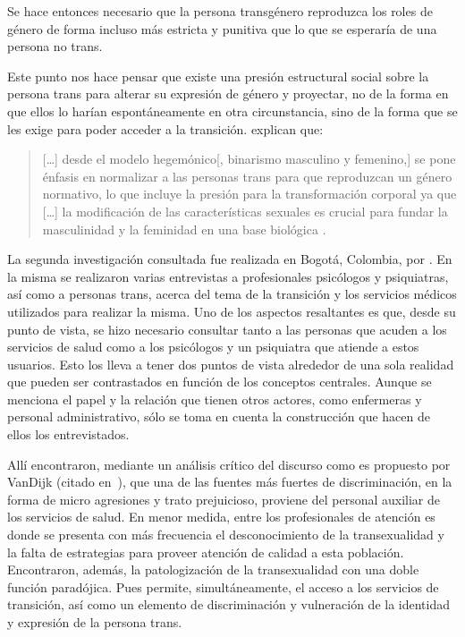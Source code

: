 Se hace entonces necesario que la persona transgénero reproduzca los roles de
género de forma incluso más estricta y punitiva que lo que se esperaría de una
persona no trans.

Este punto nos hace pensar que existe una presión estructural social sobre la
persona trans para alterar su expresión de género y proyectar, no de la forma en
que ellos lo harían espontáneamente en otra circunstancia, sino de la forma que
se les exige para poder acceder a la transición. \textcite{Coll-Planas2015}
explican que:

\begin{quote}
[…] desde el modelo hegemónico[, binarismo masculino y femenino,] se pone
énfasis en normalizar a las personas trans para que reproduzcan un género
normativo, lo que incluye la presión para la transformación corporal ya que […]
la modificación de las características sexuales es crucial para fundar la
masculinidad y la feminidad en una base biológica \parencite[][p.
427]{Coll-Planas2015}.
\end{quote}

La segunda investigación consultada fue realizada en Bogotá,
Colombia, por \textcite{LassoBaez2014}. En la misma se realizaron varias
entrevistas a profesionales psicólogos y psiquiatras, así como a personas trans,
acerca del tema de la transición y los servicios médicos utilizados para
realizar la misma. Uno de los aspectos resaltantes es que, desde su punto de
vista, se hizo necesario consultar tanto a las personas que acuden a los
servicios de salud como a los psicólogos y un psiquiatra que atiende a estos
usuarios. Esto los lleva a tener dos puntos de vista alrededor de una sola
realidad que pueden ser contrastados en función de los conceptos centrales.
Aunque se menciona el papel y la relación que tienen otros actores, como
enfermeras y personal administrativo, sólo se toma en cuenta la construcción que
hacen de ellos los entrevistados.

Allí encontraron, mediante un análisis crítico del discurso como es propuesto
por VanDijk (citado en~\cite[][p. 111]{LassoBaez2014}), que una de las fuentes
más fuertes de discriminación, en la forma de micro agresiones y trato
prejuicioso, proviene del personal auxiliar de los servicios de salud. En menor
medida, entre los profesionales de atención es donde se presenta con más
frecuencia el desconocimiento de la transexualidad y la falta de estrategias para
proveer atención de calidad a esta población. Encontraron, además, la
patologización de la transexualidad con una doble función paradójica. Pues
permite, simultáneamente, el acceso a los servicios de transición, así como un
elemento de discriminación y vulneración de la identidad y expresión de la
persona trans.

